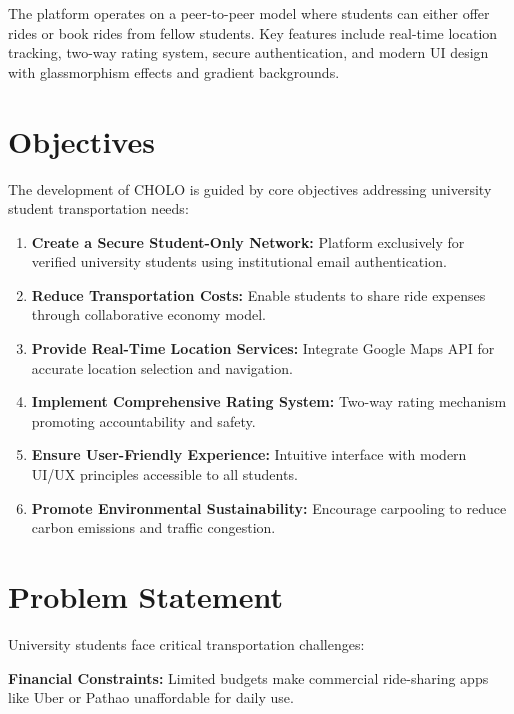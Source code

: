 \documentclass[12pt,a4paper]{article}
\begin{document}
The platform operates on a peer-to-peer model where students can either offer rides or book rides from fellow students. Key features include real-time location tracking, two-way rating system, secure authentication, and modern UI design with glassmorphism effects and gradient backgrounds.

\section{Objectives}

The development of CHOLO is guided by core objectives addressing university student transportation needs:

\begin{enumerate}
    \item \textbf{Create a Secure Student-Only Network:} Platform exclusively for verified university students using institutional email authentication.
    
    \item \textbf{Reduce Transportation Costs:} Enable students to share ride expenses through collaborative economy model.
    
    \item \textbf{Provide Real-Time Location Services:} Integrate Google Maps API for accurate location selection and navigation.
    
    \item \textbf{Implement Comprehensive Rating System:} Two-way rating mechanism promoting accountability and safety.
    
    \item \textbf{Ensure User-Friendly Experience:} Intuitive interface with modern UI/UX principles accessible to all students.
    
    \item \textbf{Promote Environmental Sustainability:} Encourage carpooling to reduce carbon emissions and traffic congestion.
\end{enumerate}

\section{Problem Statement}

University students face critical transportation challenges:

\textbf{Financial Constraints:} Limited budgets make commercial ride-sharing apps like Uber or Pathao unaffordable for daily use.
\end{document}
